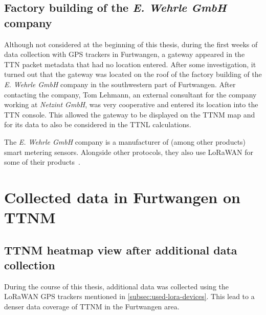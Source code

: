 \subsection{Factory building of the \emph{E. Wehrle GmbH} company}\label{subsec:factory-building-of-the-e-wehrle-company}

Although not considered at the beginning of this thesis, during the first weeks of data collection with \ac{GPS} trackers in Furtwangen, a gateway appeared in the \ac{TTN} packet metadata that had no location entered.
After some investigation, it turned out that the gateway was located on the roof of the factory building of the \emph{E. Wehrle GmbH} company in the southwestern part of Furtwangen.
After contacting the company, Tom Lehmann, an external consultant for the company working at \emph{Netzint GmbH}, was very cooperative and entered its location into the \ac{TTN} console.
This allowed the gateway to be displayed on the \ac{TTNM} map and for its data to also be considered in the \ac{TTNL} calculations.

The \emph{E. Wehrle GmbH} company is a manufacturer of (among other products) smart metering sensors.
Alongside other protocols, they also use \ac{LoRaWAN} for some of their products~\cite{e_wehrle_gmbh_wecount-s_nodate}.

\section{Collected data in Furtwangen on \acl{TTNM}}\label{sec:collected-data-in-furtwangen-on-ttnm}

\subsection{\acl{TTNM} heatmap view after additional data collection}\label{sec:ttm_heatmap_after}

During the course of this thesis, additional data was collected using the \ac{LoRaWAN} \ac{GPS} trackers mentioned in \cref{subsec:used-lora-devices}.
This lead to a denser data coverage of \acl{TTNM} in the Furtwangen area.

